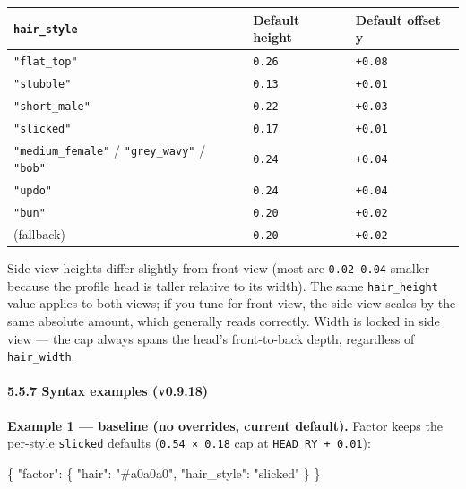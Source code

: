 \documentclass[
  11pt,
]{book}
\newenvironment{Shaded}{}{}
\newcommand{\DataTypeTok}[1]{\textcolor[rgb]{0.56,0.13,0.00}{#1}}
\newcommand{\FunctionTok}[1]{\textcolor[rgb]{0.02,0.16,0.49}{#1}}
\newcommand{\StringTok}[1]{\textcolor[rgb]{0.25,0.44,0.63}{#1}}
\begin{document}
\begin{longtable}[]{@{}
  >{\raggedright\arraybackslash}p{}
  >{\raggedright\arraybackslash}p{}
  >{\raggedright\arraybackslash}p{}@{}}
\toprule\noalign{}
\texttt{hair\_style} & Default height & Default offset y \\
\midrule\noalign{}
\endhead
\bottomrule\noalign{}
\endlastfoot
\texttt{"flat\_top"} & \texttt{0.26} & \texttt{+0.08} \\
\texttt{"stubble"} & \texttt{0.13} & \texttt{+0.01} \\
\texttt{"short\_male"} & \texttt{0.22} & \texttt{+0.03} \\
\texttt{"slicked"} & \texttt{0.17} & \texttt{+0.01} \\
\texttt{"medium\_female"} / \texttt{"grey\_wavy"} / \texttt{"bob"} &
\texttt{0.24} & \texttt{+0.04} \\
\texttt{"updo"} & \texttt{0.24} & \texttt{+0.04} \\
\texttt{"bun"} & \texttt{0.20} & \texttt{+0.02} \\
(fallback) & \texttt{0.20} & \texttt{+0.02} \\
\end{longtable}

Side-view heights differ slightly from front-view (most are
\texttt{0.02--0.04} smaller because the profile head is taller relative
to its width). The same \texttt{hair\_height} value applies to both
views; if you tune for front-view, the side view scales by the same
absolute amount, which generally reads correctly. Width is locked in
side view --- the cap always spans the head's front-to-back depth,
regardless of \texttt{hair\_width}.

\paragraph{\texorpdfstring{5.5.7 Syntax examples
(v0.9.18)}{5.5.7 Syntax examples (v0.9.18)}}\label{hair-geometry-examples}

\textbf{Example 1 --- baseline (no overrides, current default).} Factor
keeps the per-style \texttt{slicked} defaults (\texttt{0.54\ ×\ 0.18}
cap at \texttt{HEAD\_RY\ +\ 0.01}):

\begin{Shaded}
\begin{Highlighting}[]
\FunctionTok{\{}
  \DataTypeTok{"factor"}\FunctionTok{:} \FunctionTok{\{}
    \DataTypeTok{"hair"}\FunctionTok{:}       \StringTok{"\#a0a0a0"}\FunctionTok{,}
    \DataTypeTok{"hair\_style"}\FunctionTok{:} \StringTok{"slicked"}
  \FunctionTok{\}}
\FunctionTok{\}}
\end{Highlighting}
\end{Shaded}
\end{document}
